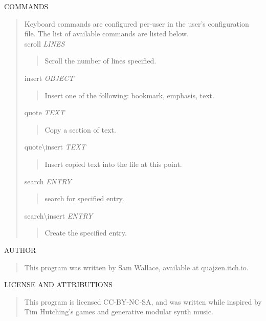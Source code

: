 \documentclass{article}
\begin{document}
COMMANDS
\begin{quote}
  Keyboard commands are configured per-user in the user's configuration file. The list of available commands are listed below. \\

  scroll \emph{LINES}
  \begin{quote}
    Scroll the number of lines specified.
  \end{quote}

  insert \emph{OBJECT}
  \begin{quote}
    Insert one of the following: bookmark, emphasis, text.
  \end{quote}

  quote \emph{TEXT}
  \begin{quote}
    Copy a section of text.
  \end{quote}

  quote\textbackslash insert \emph{TEXT}
  \begin{quote}
    Insert copied text into the file at this point.
  \end{quote}

  search \emph{ENTRY}
  \begin{quote}
    search for specified entry.
  \end{quote}

  search\textbackslash insert \emph{ENTRY}
  \begin{quote}
    Create the specified entry.
  \end{quote}
\end{quote}

AUTHOR
\begin{quote}
  This program was written by Sam Wallace, available at quajzen.itch.io.
\end{quote}

LICENSE AND ATTRIBUTIONS
\begin{quote}
  This program is licensed CC-BY-NC-SA, and was written while inspired by Tim Hutching's games and generative modular synth music.
\end{quote}

\newpage
\end{document}
